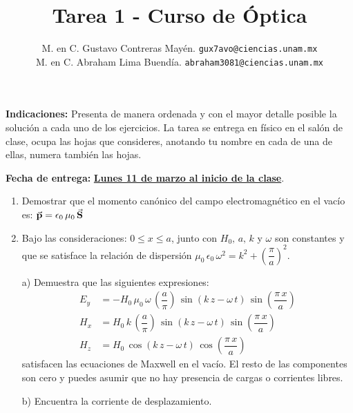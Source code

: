 \documentclass[14pt]{extarticle}
\author{\normalsize{M. en C. Gustavo Contreras Mayén.} \quad \normalsize{\texttt{gux7avo@ciencias.unam.mx}} \\
\normalsize{M. en C. Abraham Lima Buendía.} \quad \normalsize{\texttt{abraham3081@ciencias.unam.mx}}}
\title{\vspace*{-2cm} Tarea 1 - Curso de Óptica}
\date{ }
\begin{document}

\maketitle
\fontsize{14}{14}\selectfont

\textbf{Indicaciones: } Presenta de manera ordenada y con el mayor detalle posible la solución a cada uno de los ejercicios. La tarea se entrega en físico en el salón de clase, ocupa las hojas que consideres, anotando tu nombre en cada de una de ellas, numera también las hojas.

\textbf{Fecha de entrega: } \underline{\textbf{Lunes 11 de marzo al inicio de la clase}}. 

\begin{enumerate}
\item Demostrar que el momento canónico del campo electromagnético en el vacío es: $\va{p} = \epsilon_{0} \, \mu_{0} \, \va{S}$
\item Bajo las consideraciones: $0\leq x\leq a$, junto con $H_{0},\, a, \, k$ y $\omega$ son constantes y que se satisface la relación de dispersión $\mu_{0} \, \epsilon_{0} \, \omega^{2} = k^{2} + \left( \dfrac{\pi}{a} \right)^{2}$.

a) Demuestra que las siguientes expresiones:
\begin{align*}
E_{y} &= -H_{0} \, \mu_{0}\, \omega \, \left(\dfrac{a}{\pi}\right) \, \sin \left( k \, z - \omega \, t \right) \, \sin \left(\dfrac{\pi \, x}{a} \right) \\
H_{x} &= H_{0} \, k \, \left(\dfrac{a}{\pi}\right) \, \sin \left(k \, z - \omega \, t\right) \, \sin \left(\dfrac{\pi \, x}{a}\right) \\
H_{z} &= H_{0} \, \cos \left(k \, z - \omega \, t \right) \, \cos \left(\dfrac{\pi \, x}{a} \right)
\end{align*}
satisfacen las ecuaciones de Maxwell en el vacío. El resto de las componentes son cero y puedes asumir que no hay presencia de cargas o corrientes libres.

b) Encuentra la corriente de desplazamiento.


\end{enumerate}
\end{document}
